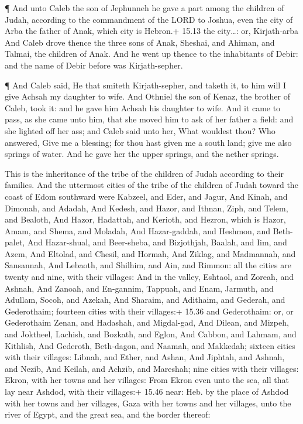  ¶ And unto Caleb the son of Jephunneh he gave a part among
the children of Judah, according to the commandment of the LORD to
Joshua, even the city of Arba the father of Anak, which city is Hebron.+
15.13 the city\ldots: or, Kirjath-arba  And Caleb drove
thence the three sons of Anak, Sheshai, and Ahiman, and Talmai, the
children of Anak.  And he went up thence to the inhabitants
of Debir: and the name of Debir before was Kirjath-sepher.

 ¶ And Caleb said, He that smiteth Kirjath-sepher, and
taketh it, to him will I give Achsah my daughter to wife. 
And Othniel the son of Kenaz, the brother of Caleb, took it: and he gave
him Achsah his daughter to wife.  And it came to pass, as
she came unto him, that she moved him to ask of her father a field: and
she lighted off her ass; and Caleb said unto her, What wouldest thou?
 Who answered, Give me a blessing; for thou hast given me a
south land; give me also springs of water. And he gave her the upper
springs, and the nether springs.

 This is the inheritance of the tribe of the children of
Judah according to their families.  And the uttermost
cities of the tribe of the children of Judah toward the coast of Edom
southward were Kabzeel, and Eder, and Jagur,  And Kinah,
and Dimonah, and Adadah,  And Kedesh, and Hazor, and
Ithnan,  Ziph, and Telem, and Bealoth,  And
Hazor, Hadattah, and Kerioth, and Hezron, which is Hazor, 
Amam, and Shema, and Moladah,  And Hazar-gaddah, and
Heshmon, and Beth-palet,  And Hazar-shual, and Beer-sheba,
and Bizjothjah,  Baalah, and Iim, and Azem, 
And Eltolad, and Chesil, and Hormah,  And Ziklag, and
Madmannah, and Sansannah,  And Lebaoth, and Shilhim, and
Ain, and Rimmon: all the cities are twenty and nine, with their
villages:  And in the valley, Eshtaol, and Zoreah, and
Ashnah,  And Zanoah, and En-gannim, Tappuah, and Enam,
 Jarmuth, and Adullam, Socoh, and Azekah,  And
Sharaim, and Adithaim, and Gederah, and Gederothaim; fourteen cities
with their villages:+ 15.36 and Gederothaim: or, or Gederothaim
 Zenan, and Hadashah, and Migdal-gad,  And
Dilean, and Mizpeh, and Joktheel,  Lachish, and Bozkath,
and Eglon,  And Cabbon, and Lahmam, and Kithlish,
 And Gederoth, Beth-dagon, and Naamah, and Makkedah;
sixteen cities with their villages:  Libnah, and Ether, and
Ashan,  And Jiphtah, and Ashnah, and Nezib, 
And Keilah, and Achzib, and Mareshah; nine cities with their villages:
 Ekron, with her towns and her villages:  From
Ekron even unto the sea, all that lay near Ashdod, with their villages:+
15.46 near: Heb. by the place of  Ashdod with her towns and
her villages, Gaza with her towns and her villages, unto the river of
Egypt, and the great sea, and the border thereof:

